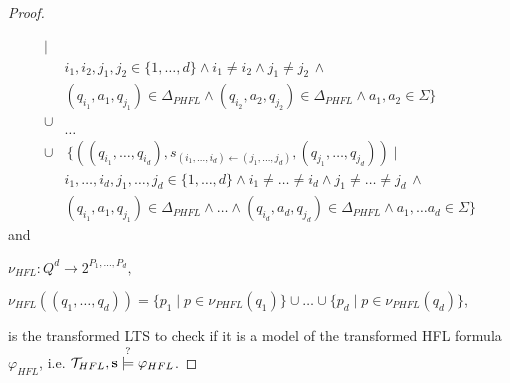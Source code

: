 \begin{proof}
\begin{compactitem}
\begin{align*}
                  \mid \\& i_1, i_2, j_1, j_2 \in \{1, \dots, d\} \wedge i_1 \neq i_2 \wedge j_1 \neq j_2 \,\wedge\\&
                   (q_{i_1}, a_1, q_{j_1}) \in \Delta_{PHFL} \wedge (q_{i_2}, a_2, q_{j_2}) \in \Delta_{PHFL}
                  \wedge a_1, a_2 \in \Sigma\} \\
            \cup &\\
            &\dots \\
                  \cup & \,\{((q_{i_1}, \dots, q_{i_d}), s_{(i_1, \dots, i_d) \leftarrow
                  (j_1, \dots, j_d)},
                  (q_{j_1}, \dots, q_{j_d})) \mid \\&
                  i_1, \dots, i_d, j_1, \dots, j_d \in \{1, \dots, d\} \wedge i_1 \neq \dots \neq i_d \wedge j_1
                  \neq \dots \neq j_d \,\wedge\\& (q_{i_1}, a_1,  q_{j_1}) \in
                  \Delta_{PHFL} \wedge \dots \wedge (q_{i_d}, a_d, q_{j_d}) \in \Delta_{PHFL}
                  \wedge a_1, \dots a_d \in \Sigma\}
        \end{align*} and
        \item $\nu_{HFL} \colon Q^d \rightarrow 2^{P_1, \dots, P_d}, $

        $\nu_{HFL}((q_1, \dots, q_d)) = \{p_1 \mid p \in \nu_{PHFL}(q_1)\} \cup \dots \cup \{p_d \mid p \in
        \nu_{PHFL}(q_d)\}$,
    \end{compactitem}
    is the transformed LTS to check if it is a model of the transformed HFL formula $\varphi_{HFL}$, i.e.
    $\mathcal{T}_{HFL}, \emph{s} \overset{?}{\models} \varphi_{HFL}$.


\end{proof}
